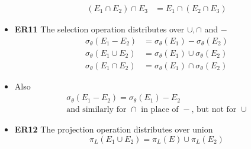 \begin{itemize}[label=\(\rhd\)]
\begin{align*}
        (E_1 \cap E_2) \cap E_3 &= E_1 \cap (E_2\cap E_3)
    \end{align*}
    \item \textbf{ER11} The selection operation distributes over $\cup, \cap$ and $-$ 
    \begin{align*}
        \sigma_\theta(E_1-E_2)&=\sigma_\theta(E_1)-\sigma_\theta(E_2) \\
        \sigma_\theta(E_1\cup E_2)&=\sigma_\theta(E_1)\cup \sigma_\theta(E_2) \\
        \sigma_\theta(E_1\cap E_2)&=\sigma_\theta(E_1)\cap \sigma_\theta(E_2)
    \end{align*}
    \item[] Also \begin{align*}
        &\sigma_\theta(E_1-E_2)=\sigma_\theta(E_1)-E_2 \\
        &\text{and similarly for $\cap$ in place of $-$, but not for $\cup$ }
    \end{align*} 
    \item \textbf{ER12} The projection operation distributes over union \[
    \pi_L(E_1\cup E_2)=\pi_L(E)\cup \pi_L(E_2)
    \]
\end{itemize}


